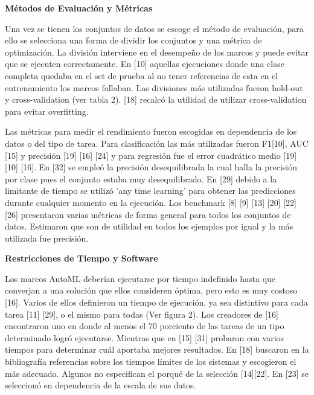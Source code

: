 \begin{flushleft} 
    {\large { \textbf{Métodos de Evaluación y Métricas}}}\label{subsection:met_AutoML}
\end{flushleft}

Una vez se tienen los conjuntos de datos se escoge el método de evaluación, para ello se selecciona una forma de dividir los conjuntos y una métrica de optimización. La 
división interviene en el desempeño de los marcos y puede evitar que se ejecuten correctamente. En [10] aquellas ejecuciones donde una clase completa quedaba en el set 
de prueba al no tener referencias de esta en el entrenamiento los marcos fallaban.  Las divisiones más utilizadas fueron hold-out y cross-validation (ver tabla 2). [18] 
recalcó la utilidad de utilizar cross-validation para evitar overfitting. 

Las métricas para medir el rendimiento fueron escogidas en dependencia de los datos o del tipo 
de tarea. Para clasificación las más utilizadas fueron F1[10], AUC [15] y precisión [19] [16] [24] y para regresión fue el error cuadrático medio [19] [10] [16]. En [32] 
se empleó la precisión desequilibrada la cual halla la precisión por clase pues el conjunto estaba muy desequilibrado. En [29] debido a la limitante de tiempo se utilizó 
'any time learning' para obtener las predicciones durante cualquier momento en la ejecución. Los benchmark [8] [9] [13] [20] [22] [26] presentaron varias métricas de 
forma general para todos los conjuntos de datos. Estimaron que son de utilidad en todos los ejemplos por igual y la más utilizada fue precisión.   

\begin{flushleft} 
    {\large { \textbf{Restricciones de Tiempo y  Software}}}\label{subsection:tiempo_AutoML}
\end{flushleft}

Los marcos AutoML deberían ejecutarse por tiempo indefinido hasta que converjan a una solución que ellos consideren óptima, pero esto es muy costoso [16]. Varios de 
ellos definieron un tiempo de ejecución, ya sea distintivo para cada tarea [11] [29], o el mismo para todas (Ver figura 2). Los creadores de [16] encontraron uno en donde al menos el 
70 porciento de las tareas de un tipo determinado logró ejecutarse. Mientras que en [15] [31] probaron con varios tiempos para determinar cuál aportaba mejores resultados. En [18] buscaron 
en la bibliografía referencias sobre los tiempos límites de los sistemas y escogieron el más adecuado. Algunos no especifican el porqué de la selección [14][22]. En [23] se seleccionó en dependencia de 
la escala de sus datos.    

